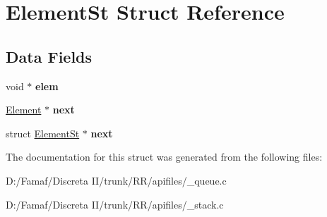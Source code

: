 \hypertarget{struct_element_st}{\section{Element\+St Struct Reference}
\label{struct_element_st}
}
\subsection*{Data Fields}
\begin{DoxyCompactItemize}
\item 
\hypertarget{struct_element_st_ada29e83f788099982d018d2660f3262f}{void $\ast$ {\bfseries elem}}\label{struct_element_st_ada29e83f788099982d018d2660f3262f}

\item 
\hypertarget{struct_element_st_ab754198c88211ca1d1700013ad3fc13b}{\hyperlink{struct_element_st}{Element} $\ast$ {\bfseries next}}\label{struct_element_st_ab754198c88211ca1d1700013ad3fc13b}

\item 
\hypertarget{struct_element_st_aec722a74d4a09b2939fc07d4234e45fe}{struct \hyperlink{struct_element_st}{Element\+St} $\ast$ {\bfseries next}}\label{struct_element_st_aec722a74d4a09b2939fc07d4234e45fe}

\end{DoxyCompactItemize}


The documentation for this struct was generated from the following files\+:\begin{DoxyCompactItemize}
\item 
D\+:/\+Famaf/\+Discreta I\+I/trunk/\+R\+R/apifiles/\+\_\+queue.\+c\item 
D\+:/\+Famaf/\+Discreta I\+I/trunk/\+R\+R/apifiles/\+\_\+stack.\+c\end{DoxyCompactItemize}
